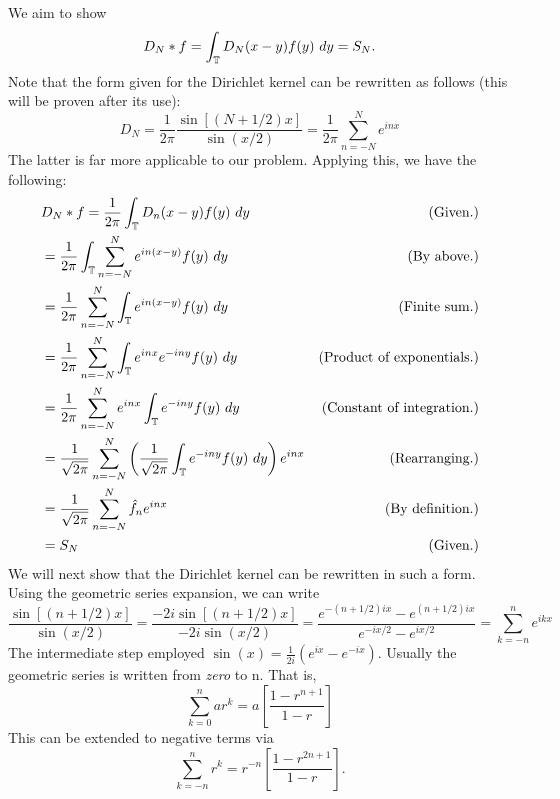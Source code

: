 \begin{solution}

    We aim to show
    \[D_N \ast f = \int_{\mathbb{T}} D_N(x - y)f(y) \ dy = S_N.\]
    Note that the form given for the Dirichlet kernel can be rewritten as follows (this will be proven after its use):
    \[D_N = \frac{1}{2\pi}\frac{\sin [(N + 1/2)x]}{\sin(x/2)} = \frac{1}{2\pi}\sum_{n = -N}^{N} e^{inx}\]
    The latter is far more applicable to our problem. Applying this, we have the following:
    \tightalignbreak
    \begin{align*}
        &D_N\ast f = \frac{1}{2\pi}\int_{\scT} D_n(x - y) f(y) \ dy &\text{(Given.)}\\
        &= \frac{1}{2\pi}\int_{\scT} \sum_{n =-N}^N e^{in(x-y)} f(y) \ dy &\text{(By above.)}\\
        &= \frac{1}{2\pi} \sum_{n =-N}^N \int_{\scT}e^{in(x-y)} f(y) \ dy &\text{(Finite sum.)}\\
        &= \frac{1}{2\pi} \sum_{n =-N}^N \int_{\scT}e^{inx}e^{-iny} f(y) \ dy &\text{(Product of exponentials.)}\\
        &= \frac{1}{2\pi} \sum_{n =-N}^N e^{inx}\int_{\scT}e^{-iny} f(y) \ dy &\text{(Constant of integration.)}\\
        &=\frac{1}{\sqrt{2\pi}}\sum_{n =-N}^N \left( \frac{1}{\sqrt{2\pi}}\int_{\scT}e^{-iny} f(y) \ dy\right)e^{inx}  &\text{(Rearranging.)}\\
        &=\frac{1}{\sqrt{2\pi}}\sum_{n =-N}^N \hat{f}_ne^{inx}  &\text{(By definition.)}\\
        &= S_N &\text{(Given.)}
    \end{align*}    
    \vspace{-12mm}\alignbreak
    We will next show that the Dirichlet kernel can be rewritten in such a form. Using the geometric series expansion, we can write
    \[\frac{\sin [(n + 1/2)x]}{\sin(x/2)} = \frac{-2i\sin [(n + 1/2)x]}{-2i\sin(x/2)} = \frac{e^{-(n+1/2)ix} - e^{(n+1/2)ix}}{e^{-ix/2} - e^{ix/2}} = \sum_{k = -n}^n e^{ikx}\]
    The intermediate step employed $\sin(x) = \frac{1}{2i}(e^{ix} - e^{-ix})$. Usually the geometric series is written from \textit{zero} to n. That is, 
    \[\sum_{k = 0}^n ar^k = a\left[ \frac{1 - r^{n+1}}{1 - r}\right]\]
    This can be extended to negative terms via
    \[\sum_{k = -n}^n r^k = r^{-n}\left[ \frac{1 - r^{2n+1}}{1-r}\right].\]
    
\end{solution}


\newpage
